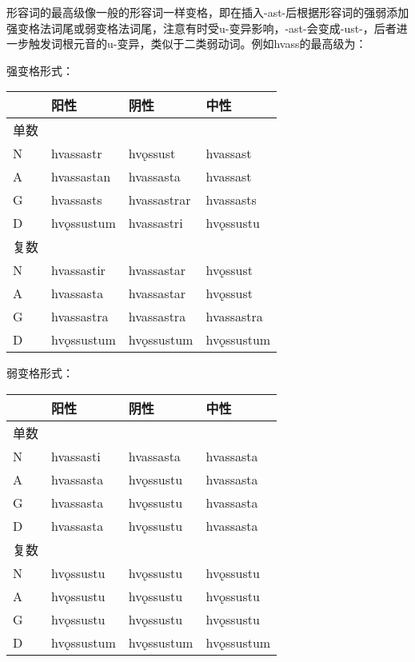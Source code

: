 形容词的最高级像一般的形容词一样变格，即在插入-ast-后根据形容词的强弱添加强变格法词尾或弱变格法词尾，注意有时受u-变异影响，-ast-会变成-ust-，后者进一步触发词根元音的u-变异，类似于二类弱动词。例如hvass的最高级为：

强变格形式：

\begin{longtable}{llll}
  \toprule
       & 阳性       & 阴性        & 中性       \\
  \midrule
  \endhead
  \bottomrule
  \endfoot
  单数 &            &             &            \\
  N    & hvassastr  & hvǫssust    & hvassast   \\
  A    & hvassastan & hvassasta   & hvassast   \\
  G    & hvassasts  & hvassastrar & hvassasts  \\
  D    & hvǫssustum & hvassastri  & hvǫssustu  \\
  复数 &            &             &            \\
  N    & hvassastir & hvassastar  & hvǫssust   \\
  A    & hvassasta  & hvassastar  & hvǫssust   \\
  G    & hvassastra & hvassastra  & hvassastra \\
  D    & hvǫssustum & hvǫssustum  & hvǫssustum \\
\end{longtable}

弱变格形式：

\begin{longtable}{llll}
  \toprule
       & 阳性       & 阴性       & 中性       \\
  \midrule
  \endhead
  \bottomrule
  \endfoot
  单数 &            &            &            \\
  N    & hvassasti  & hvassasta  & hvassasta  \\
  A    & hvassasta  & hvǫssustu  & hvassasta  \\
  G    & hvassasta  & hvǫssustu  & hvassasta  \\
  D    & hvassasta  & hvǫssustu  & hvassasta  \\
  复数 &            &            &            \\
  N    & hvǫssustu  & hvǫssustu  & hvǫssustu  \\
  A    & hvǫssustu  & hvǫssustu  & hvǫssustu  \\
  G    & hvǫssustu  & hvǫssustu  & hvǫssustu  \\
  D    & hvǫssustum & hvǫssustum & hvǫssustum \\
\end{longtable}

